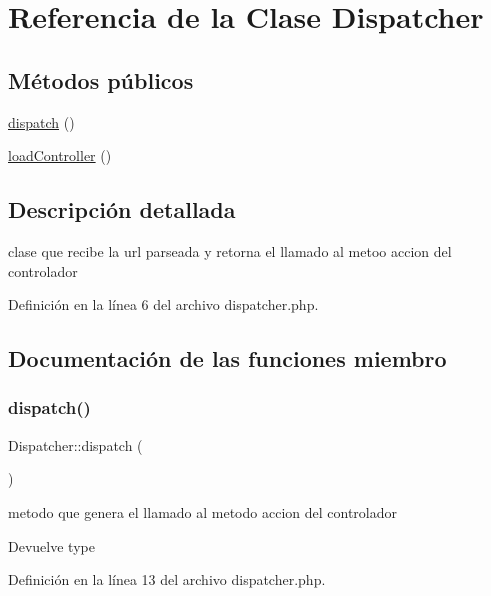 \hypertarget{class_dispatcher}{}\section{Referencia de la Clase Dispatcher}
\label{class_dispatcher}
\subsection*{Métodos públicos}
\begin{DoxyCompactItemize}
\item 
\mbox{\hyperlink{class_dispatcher_af79aa0f7056d4bc6765f940a9a0fb039}{dispatch}} ()
\item 
\mbox{\hyperlink{class_dispatcher_a4881c5f9c9949c71632cd659fae77bc1}{load\+Controller}} ()
\end{DoxyCompactItemize}


\subsection{Descripción detallada}
clase que recibe la url parseada y retorna el llamado al metoo accion del controlador 

Definición en la línea 6 del archivo dispatcher.\+php.



\subsection{Documentación de las funciones miembro}
\mbox{\label{class_dispatcher_af79aa0f7056d4bc6765f940a9a0fb039}} 
\subsubsection{\texorpdfstring{dispatch()}{dispatch()}}
{\footnotesize\ttfamily Dispatcher\+::dispatch (\begin{DoxyParamCaption}{ }\end{DoxyParamCaption})}

metodo que genera el llamado al metodo accion del controlador

\begin{DoxyReturn}{Devuelve}
type 
\end{DoxyReturn}


Definición en la línea 13 del archivo dispatcher.\+php.

